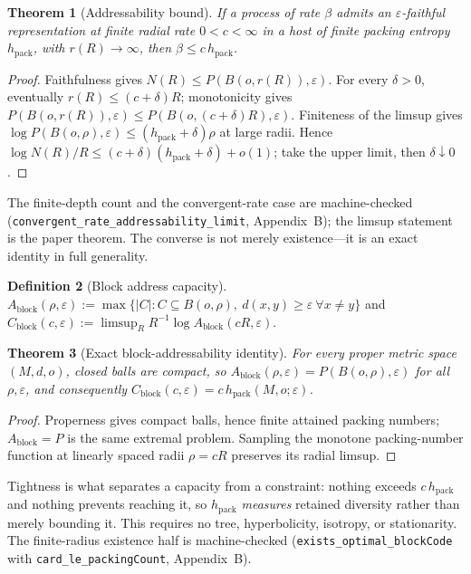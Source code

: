 \documentclass[11pt,reqno]{amsart}
\theoremstyle{plain}
\newtheorem{theorem}{Theorem}[section]
\theoremstyle{definition}
\newtheorem{definition}[theorem]{Definition}
\newcommand{\hpack}{h_{\mathrm{pack}}}
\newcommand{\Cblock}{C_{\mathrm{block}}}
\newcommand{\eps}{\varepsilon}
\begin{document}
\begin{theorem}[Addressability bound]\label{thm:bound}
If a process of rate $\beta$ admits an $\eps$-faithful representation at finite radial rate $0<c<\infty$ in a host of finite packing entropy $\hpack$, with $r(R)\to\infty$, then $\beta\le c\,\hpack$.
\end{theorem}

\begin{proof}
Faithfulness gives $N(R)\le P(B(o,r(R)),\eps)$. For every $\delta>0$, eventually $r(R)\le(c+\delta)R$; monotonicity gives $P(B(o,r(R)),\eps)\le P(B(o,(c+\delta)R),\eps)$. Finiteness of the limsup gives $\log P(B(o,\rho),\eps)\le(\hpack+\delta)\rho$ at large radii. Hence $\log N(R)/R\le(c+\delta)(\hpack+\delta)+o(1)$; take the upper limit, then $\delta\downarrow0$.
\end{proof}

The finite-depth count and the convergent-rate case are machine-checked (\texttt{convergent\_rate\_addressability\_limit}, Appendix~B); the limsup statement is the paper theorem. The converse is not merely existence---it is an exact identity in full generality.

\begin{definition}[Block address capacity]
$A_{\mathrm{block}}(\rho,\eps):=\max\{|C|:C\subseteq B(o,\rho),\ d(x,y)\ge\eps\ \forall x\ne y\}$ and $\Cblock(c,\eps):=\limsup_R R^{-1}\log A_{\mathrm{block}}(cR,\eps)$.
\end{definition}

\begin{theorem}[Exact block-addressability identity]\label{thm:block}
For every proper metric space $(M,d,o)$, closed balls are compact, so $A_{\mathrm{block}}(\rho,\eps)=P(B(o,\rho),\eps)$ for all $\rho,\eps$, and consequently $\Cblock(c,\eps)=c\,\hpack(M,o;\eps)$.
\end{theorem}

\begin{proof}
Properness gives compact balls, hence finite attained packing numbers; $A_{\mathrm{block}}=P$ is the same extremal problem. Sampling the monotone packing-number function at linearly spaced radii $\rho=cR$ preserves its radial limsup.
\end{proof}

Tightness is what separates a capacity from a constraint: nothing exceeds $c\,\hpack$ and nothing prevents reaching it, so $\hpack$ \emph{measures} retained diversity rather than merely bounding it. This requires no tree, hyperbolicity, isotropy, or stationarity. The finite-radius existence half is machine-checked (\texttt{exists\_optimal\_blockCode} with \texttt{card\_le\_packingCount}, Appendix~B).
\end{document}
